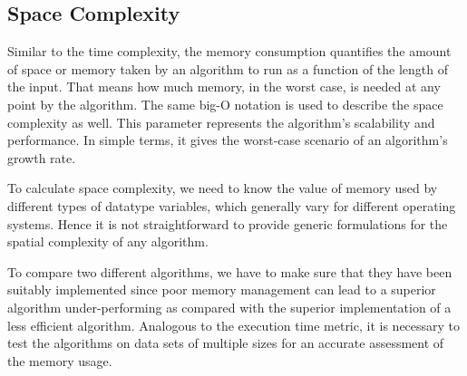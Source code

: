 \documentclass[../UNBThesis2.tex]{subfiles}
\begin{document}
\subsection{Space Complexity} 
Similar to the time complexity, the memory consumption quantifies the amount of space or memory taken by an algorithm to run as a function of the length of the input. That means how much memory, in the worst case, is needed at any point by the algorithm. The same big-O notation is used to describe the space complexity as well. This parameter represents the algorithm’s scalability and performance. In simple terms, it gives the worst-case scenario of an algorithm’s growth rate.

To calculate space complexity, we need to know the value of memory used by different types of datatype variables, which generally vary for different operating systems. Hence it is not straightforward to provide generic formulations for the spatial complexity of any algorithm.

To compare two different algorithms, we have to make sure that they have been suitably implemented since poor memory management can lead to a superior algorithm under-performing as compared with the superior implementation of a less efficient algorithm. Analogous to the execution time metric, it is necessary to test the algorithms on data sets of multiple sizes for an accurate assessment of the memory usage. 






\end{document}
